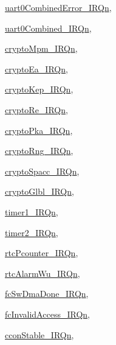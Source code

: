 \begin{DoxyCompactItemize}
\hyperlink{a00468_a666eb0caeb12ec0e281415592ae89083aee4eb0d7a4a4a7be922c1b317ec3ebea}{uart0CombinedError\_\-IRQn}, 
\par
\hyperlink{a00468_a666eb0caeb12ec0e281415592ae89083a8820063b48d797283a8cf3689b2ab29a}{uart0Combined\_\-IRQn}, 
\par
\hyperlink{a00468_a666eb0caeb12ec0e281415592ae89083a9ce7afb3cde172d3e80cc29f2ae71205}{cryptoMpm\_\-IRQn}, 
\par
\hyperlink{a00468_a666eb0caeb12ec0e281415592ae89083a5eb26890f76a262d26d394fd80dfa05b}{cryptoEa\_\-IRQn}, 
\par
\hyperlink{a00468_a666eb0caeb12ec0e281415592ae89083a326fcf064259d4ee08a7b440441f278d}{cryptoKep\_\-IRQn}, 
\par
\hyperlink{a00468_a666eb0caeb12ec0e281415592ae89083ab4c2a39182a9cec3305daa0c8e21f534}{cryptoRe\_\-IRQn}, 
\par
\hyperlink{a00468_a666eb0caeb12ec0e281415592ae89083a603c40a0856e041b477c552ce37a8bb3}{cryptoPka\_\-IRQn}, 
\par
\hyperlink{a00468_a666eb0caeb12ec0e281415592ae89083aab52c59bdc39e2a1c8032915226cfe81}{cryptoRng\_\-IRQn}, 
\par
\hyperlink{a00468_a666eb0caeb12ec0e281415592ae89083a447f4087e7271c7f4d22077902193661}{cryptoSpacc\_\-IRQn}, 
\par
\hyperlink{a00468_a666eb0caeb12ec0e281415592ae89083a9cb01098880582df39d3f362bf751d5d}{cryptoGlbl\_\-IRQn}, 
\par
\hyperlink{a00468_a666eb0caeb12ec0e281415592ae89083a5aa593b60b65364d73d2be3c9ae9f129}{timer1\_\-IRQn}, 
\par
\hyperlink{a00468_a666eb0caeb12ec0e281415592ae89083a09abf650d1b83dfd469eca5f85e1723c}{timer2\_\-IRQn}, 
\par
\hyperlink{a00468_a666eb0caeb12ec0e281415592ae89083aeca622932ca973346edf1e1c3a5016f4}{rtcPcounter\_\-IRQn}, 
\par
\hyperlink{a00468_a666eb0caeb12ec0e281415592ae89083a7be63c0f52cb53a9d80ab5c1b7d3072d}{rtcAlarmWu\_\-IRQn}, 
\par
\hyperlink{a00468_a666eb0caeb12ec0e281415592ae89083a121c5c4e78007c24385cbb9b6057cd42}{fcSwDmaDone\_\-IRQn}, 
\par
\hyperlink{a00468_a666eb0caeb12ec0e281415592ae89083a0a470ec9e257b7a05774c5a8cc69394f}{fcInvalidAccess\_\-IRQn}, 
\par
\hyperlink{a00468_a666eb0caeb12ec0e281415592ae89083a7412a4bb12b274bc61ab4a9ae6ff9641}{cconStable\_\-IRQn}, 
\par

\end{DoxyCompactItemize}
